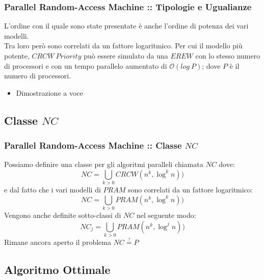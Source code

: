 \documentclass{beamer}
\newcommand{\bigO}{\ensuremath{\mathcal{O}}} %
\begin{document}
\begin{frame}
	\frametitle{Parallel Random-Access Machine :: Tipologie e Ugualianze} %
	L'ordine con il quale sono state presentate è anche l'ordine di potenza dei vari modelli.\\
	Tra loro però sono correlati da un fattore logaritmico. Per cui il modello più potente, $CRCW\ Priority$ può essere simulato da una $EREW$ con lo stesso numero di processori e con un tempo parallelo aumentato di $\bigO{(log\ P)}$; dove $P$ è il numero di processori.
	\begin{itemize}
		\item Dimostrazione a voce
	\end{itemize}
\end{frame}


\subsection{Classe $NC$}
\begin{frame}
	\frametitle{Parallel Random-Access Machine :: Classe $NC$} %
	Possiamo definire una classe per gli algoritmi paralleli chiamata $NC$ dove:
	\begin{equation}
		NC = \bigcup_{k>0} CRCW(n^k,\log^k n))
	\end{equation}
	e dal fatto che i vari modelli di $PRAM$ sono correlati da un fattore logaritmico: 
	\begin{equation}
		NC = \bigcup_{k>0} PRAM(n^k,\log^k n))
	\end{equation}
	Vengono anche definite sotto-classi di $NC$ nel seguente modo:
	\begin{equation}
		NC_j = \bigcup_{k>0} PRAM(n^k,\log^j n))
	\end{equation}
	Rimane ancora aperto il problema $NC \stackrel{?}{=} P$
	
\end{frame}

\subsection{Algoritmo Ottimale}
\end{document}
